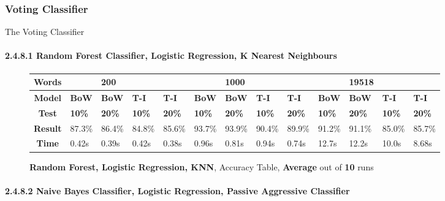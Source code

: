 \documentclass{article}
\begin{document}
\subsubsection{Voting Classifier}
	\par The Voting Classifier
	\paragraph{2.4.8.1 Random Forest Classifier, Logistic Regression, K Nearest Neighbours}
	\begin{figure}[!h]
		\begin{tabular}{||c||l|l|l|l||l|l|l|l||l|l|l|l||}
			\hline
			\textbf{Words} &  & \textbf{200} & & & &\textbf{1000} & & & & \textbf{19518} &  & \\ \hline 
			\textbf{Model} & \textbf{BoW} & \textbf{BoW} & \textbf{T-I} & \textbf{T-I} &\textbf{BoW} & \textbf{BoW} & \textbf{T-I} & \textbf{T-I} & \textbf{BoW} & \textbf{BoW} & \textbf{T-I} & \textbf{T-I}\\ \hline
			\textbf{Test} & \textbf{10\%} & \textbf{20\%} & \textbf{10\%} & \textbf{20\%} & \textbf{10\%} & \textbf{20\%} & \textbf{10\%} & \textbf{20\%} & \textbf{10\%} & \textbf{20\%} & \textbf{10\%} & \textbf{20\%} \\ \hline \hline  
			\textbf{Result} & 87.3\% & 86.4\% & 84.8\% & 85.6\% & 93.7\% & 93.9\% & 90.4\% & 89.9\% & 91.2\% & 91.1\% & 85.0\% & 85.7\% \\ \hline 
			\textbf{Time} &0.42s & 0.39s & 0.42s & 0.38s & 0.96s &0.81s & 0.94s & 0.74s & 12.7s &12.2s & 10.0s &8.68s \\ \hline 
		\end{tabular}
		\caption{\textbf{Random Forest, Logistic Regression, KNN}, Accuracy Table, \textbf{Average} out of \textbf{10} runs}
	\end{figure}
	\paragraph{2.4.8.2 Naive Bayes Classifier, Logistic Regression, Passive Aggressive Classifier}
	
\end{document}
